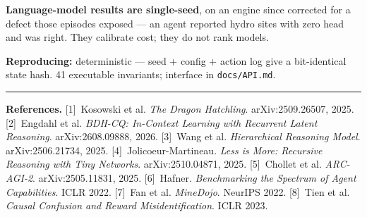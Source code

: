 \documentclass[9pt]{extarticle}
\begin{document}
\textbf{Language-model results are single-seed}, on an engine since corrected for
a defect those episodes exposed --- an agent reported hydro sites with zero head
and was right. They calibrate cost; they do not rank models.

{\footnotesize\textbf{Reproducing:} deterministic --- seed + config + action log
give a bit-identical state hash. 41 executable invariants; interface in
\texttt{docs/API.md}.}

\vspace{0.3ex}
\hrule
\vspace{0.5ex}
{\tiny
\textbf{References.}
[1]~Kosowski et al. \emph{The Dragon Hatchling}. arXiv:2509.26507, 2025.
[2]~Engdahl et al. \emph{BDH-CQ: In-Context Learning with Recurrent Latent Reasoning}. arXiv:2608.09888, 2026.
[3]~Wang et al. \emph{Hierarchical Reasoning Model}. arXiv:2506.21734, 2025.
[4]~Jolicoeur-Martineau. \emph{Less is More: Recursive Reasoning with Tiny Networks}. arXiv:2510.04871, 2025.
[5]~Chollet et al. \emph{ARC-AGI-2}. arXiv:2505.11831, 2025.
[6]~Hafner. \emph{Benchmarking the Spectrum of Agent Capabilities}. ICLR 2022.
[7]~Fan et al. \emph{MineDojo}. NeurIPS 2022.
[8]~Tien et al. \emph{Causal Confusion and Reward Misidentification}. ICLR 2023.
\par}
\end{document}
